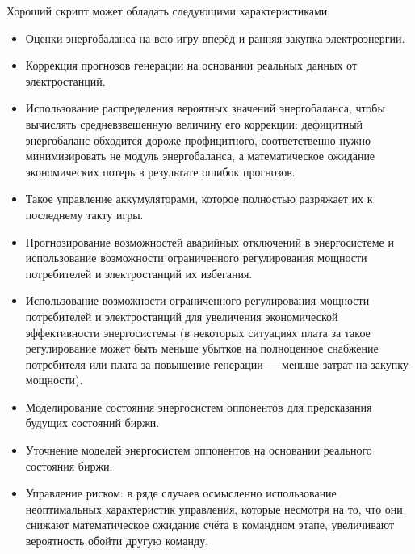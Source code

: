 Хороший скрипт может обладать следующими характеристиками:

\begin{itemize}
    \item Оценки энергобаланса на всю игру вперёд и ранняя закупка электроэнергии.
    \item Коррекция прогнозов генерации на основании реальных данных от электростанций.
    \item Использование распределения вероятных значений энергобаланса, чтобы вычислять средневзвешенную величину его коррекции: дефицитный энергобаланс обходится дороже профицитного, соответственно нужно минимизировать не модуль энергобаланса, а математическое ожидание экономических потерь в результате ошибок прогнозов.
    \item Такое управление аккумуляторами, которое полностью разряжает их к последнему такту игры.
    \item Прогнозирование возможностей аварийных отключений в энергосистеме и использование возможности ограниченного регулирования мощности потребителей и электростанций их избегания.
    \item Использование возможности ограниченного регулирования мощности потребителей и электростанций для увеличения экономической эффективности энергосистемы (в некоторых ситуациях плата за такое регулирование может быть меньше убытков на полноценное снабжение потребителя или плата за повышение генерации — меньше затрат на закупку мощности).
    \item Моделирование состояния энергосистем оппонентов для предсказания будущих состояний биржи.
    \item Уточнение моделей энергосистем оппонентов на основании реального состояния биржи.
    \item Управление риском: в ряде случаев осмысленно использование неоптимальных характеристик управления, которые несмотря на то, что они снижают математическое ожидание счёта в командном этапе, увеличивают вероятность обойти другую команду.    
\end{itemize}

\solutionSection

\inputminted[fontsize=\footnotesize, linenos]{python}{final/command_tour/ies/task_01/subtask_03/source_1.py}

